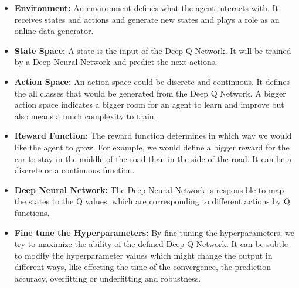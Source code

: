 \begin{itemize}
	
    \item \textbf{Environment:} An environment defines what the agent interacts with. It receives states and actions and generate new states and plays a role as an online data generator. 
    \item \textbf{State Space:} A state is the input of the Deep Q Network. It will be trained by a Deep Neural Network and predict the next actions.
    \item \textbf{Action Space:} An action space could be discrete and continuous. It defines the all classes that would be generated from the Deep Q Network. A bigger action space indicates a bigger room for an agent to learn and improve but also means a much complexity to train.
    \item \textbf{Reward Function:} The reward function determines in which way we would like the agent to grow. For example, we would define a bigger reward for the car to stay in the middle of the road than in the side of the road. It can be a discrete or a continuous function.
    \item \textbf{Deep Neural Network:} The Deep Neural Network is responsible to map the states to the Q values, which are corresponding to different actions by Q functions. 
    \item \textbf{Fine tune the Hyperparameters:} By fine tuning the hyperparameters, we try to maximize the ability of the defined Deep Q Network. It can be subtle to modify the hyperparameter values which might change the output in different ways, like effecting the time of the convergence, the prediction accuracy, overfitting or underfitting and robustness.
    
\end{itemize}






